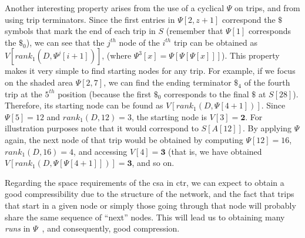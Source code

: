 	Another interesting property arises from the use of a cyclical $\Psi$ on trips, and from using trip terminators.
	Since the first entries in $\Psi[2,z+1]$ correspond the $\$$ symbols that 
	mark the end of each trip in $S$ (remember that $\Psi[1]$ corresponds the $\$_0$), we
	can see that the $j^{th}$ node of the $i^{th}$ trip can
	be obtained as $V[rank_1(D, \Psi^j[i+1])]$, (where $\Psi^3[x]= \Psi[\Psi[\Psi[x]]]$). This property
	makes it very simple to find starting nodes for any trip.
	For example, if we focus on the shaded area $\Psi[2,7]$, we can find the ending terminator $\$_4$ of the
	fourth trip at the $5^{th}$ position (because the first $\$_0$
	corresponds to the final $\$$ at $S[28]$). Therefore, its starting node can be found 
	as $V[rank_1(D, \Psi[4+1])]$. Since $\Psi[5] = 12$ and $rank_1(D,12)= 3$, 
	the starting node is $V[3]=\mathbf{2}$. For illustration purposes note that it would correspond to $S[A[12]]$.
	By applying $\Psi$ again, the next node of that trip would be obtained by computing $\Psi[12] = 16$, 
	$rank_1(D,16)=4$, and accessing $V[4]=\mathbf{3}$  (that is, we have obtained 
	 $V[rank_1(D, \Psi[\Psi[4+1]])]=\mathbf{3}$, and so on. 



	Regarding the space requirements of the \gls{csa} in \gls{ctr}, we can expect to obtain a good compressibility
	due to the structure of the network, and the fact that trips that start in a given node or simply
	those going through that node will probably share the same sequence of ``next'' nodes. This will
	lead us to obtaining many {\em runs} in $\Psi$~\cite{NM07}, and consequently, good compression.

